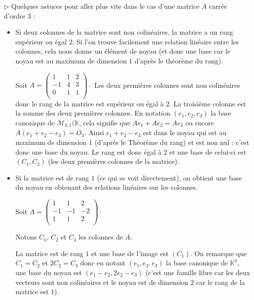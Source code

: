 \documentclass[french,11pt,twoside]{VcCours}
\begin{document}
\begin{Exemple}
\vspace*{13cm}
\end{Exemple}

\medskip

$\rhd$ Quelques astuces pour aller plus vite dans le cas d'une matrice $A$ carrée d'ordre $3$ :

\begin{itemize}
\item Si deux colonnes de la matrice sont non colinéaires, la matrice a un rang supérieur ou égal $2$. Si l'on trouve facilement une relation linéaire entre les colonnes, cela nous donne un élément de noyau (et donc une base car le noyau est au maximum de dimension $1$ d'après le théorème du rang).



\begin{Exemple} Soit $A = \begin{pmatrix}
1 & 1 & 2 \\
-1 & 4 & 3 \\
0 & 1 & 1 \\
\end{pmatrix} \cdot$
%
Les deux premières colonnes sont non colinéaires donc le rang de la matrice est supérieur ou égal à $2$. La troisième colonne est la somme des deux premières colonnes. En notation $(e_1,e_2,e_3)$ la base canonique de $\mathcal{M}_{3,1}(\mathbb{K}$, cela signifie que $Ae_1 + Ae_2 = Ae_3$ ou encore $A(e_1+e_2-e_3) = O_{3}$. Ainsi $e_1+e_2-e_3$ est dans le noyau qui est au maximum de dimension $1$ (d'après le Théorème du rang) et est non nul : c'est donc une base du noyau. Le rang est donc égal à $2$ et une base de celui-ci est $(C_1,C_2)$ (les deux premières colonnes de la matrice).

\vspace{5cm}
\end{Exemple}
\item Si la matrice est de rang $1$ (ce qui se voit directement), on obtient une base du noyau en obtenant des relations linéaires sur les colonnes.

\begin{Exemple} Soit $A = \begin{pmatrix}
1 & 1 & 2 \\
-1 & -1 & -2 \\
1 & 1 & 2 \\
\end{pmatrix} \cdot$

Notons $C_1$, $C_2$ et $C_3$ les colonnes de $A$.

La matrice est de rang $1$ et une base de l'image est $(C_1)$. On remarque que $C_1=C_2$ et $2C_2=C_3$ donc en notant $(e_1,e_2,e_3)$ la base canonique de $\mathbb{K}^3$, une base du noyau est $(e_1-e_2, 2e_2-e_3)$ (c'est une famille libre car les deux vecteurs sont non colinéaires et le noyau est de dimension $2$ car le rang de la matrice est $1$).

\vspace{5cm}
\end{Exemple}
\end{itemize}
\end{document}
